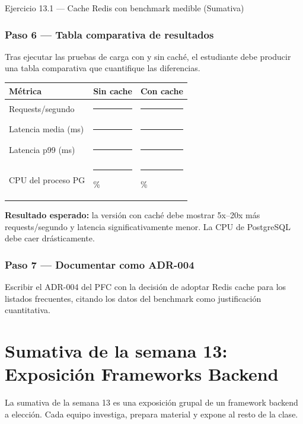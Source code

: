 \begin{cajaejercicio}{Ejercicio 13.1 --- Cache Redis con benchmark medible (Sumativa)}
\subsubsection*{Paso 6 --- Tabla comparativa de resultados}

Tras ejecutar las pruebas de carga con y sin caché, el
estudiante debe producir una tabla comparativa que cuantifique las
diferencias.


\begin{tabularx}{\textwidth}{Xll}
\toprule
\textbf{Métrica} & \textbf{Sin cache} & \textbf{Con cache}\\
\midrule
Requests/segundo  & \rule{1cm}{0.4pt} & \rule{1cm}{0.4pt} \\
Latencia media (ms) & \rule{1cm}{0.4pt} & \rule{1cm}{0.4pt} \\
Latencia p99 (ms)  & \rule{1cm}{0.4pt} & \rule{1cm}{0.4pt} \\
CPU del proceso PG & \rule{1cm}{0.4pt}\% & \rule{1cm}{0.4pt}\% \\
\bottomrule
\end{tabularx}

\textbf{Resultado esperado:} la versión con caché debe mostrar 5x--20x
más requests/segundo y latencia significativamente menor. La CPU de
PostgreSQL debe caer drásticamente.

\subsubsection*{Paso 7 --- Documentar como ADR-004}

Escribir el ADR-004 del PFC con la decisión de adoptar Redis cache
para los listados frecuentes, citando los datos del benchmark como
justificación cuantitativa.
\end{cajaejercicio}

\section{Sumativa de la semana 13: Exposición Frameworks Backend}

La sumativa de la semana 13 es una exposición grupal de un
framework backend a elección. Cada equipo investiga, prepara
material y expone al resto de la clase.


